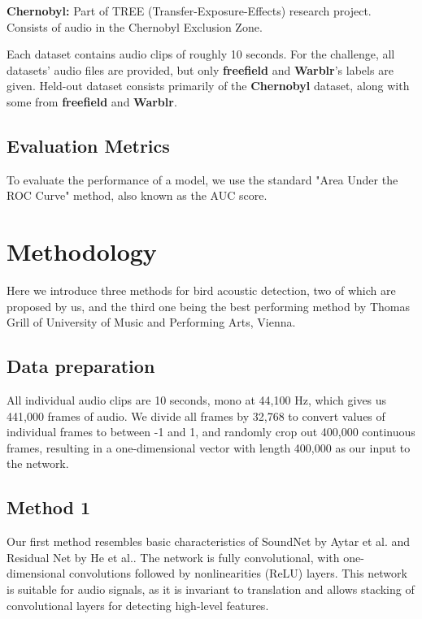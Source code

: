 \documentclass[10pt,twocolumn,letterpaper]{article}
\begin{document}
\textbf{Chernobyl:} Part of TREE (Transfer-Exposure-Effects) research
project. Consists of audio in the Chernobyl Exclusion Zone. 

Each dataset contains audio clips of roughly 10 seconds. For the challenge,
all datasets' audio files are provided, but only \textbf{freefield} and
\textbf{Warblr}'s labels are given. Held-out dataset consists primarily of
the \textbf{Chernobyl} dataset, along with some from \textbf{freefield} and
\textbf{Warblr}.

\subsection{Evaluation Metrics}

To evaluate the performance of a model, we use the standard "Area Under the
ROC Curve" method, also known as the AUC score.

\section{Methodology}

Here we introduce three methods for bird acoustic detection, two of which
are proposed by us, and the third one being the best performing method by
Thomas Grill of University of Music and Performing Arts, Vienna. 

\subsection{Data preparation}

All individual audio clips are 10 seconds, mono at 44,100 Hz, which gives us
441,000 frames of audio. We divide all frames by 32,768 to convert values of
individual frames to between -1 and 1, and randomly crop out 400,000
continuous frames, resulting in a one-dimensional vector with length 400,000
as our input to the network.

\subsection{Method 1}

Our first method resembles basic characteristics of SoundNet by Aytar et
al.\cite{soundnet} and Residual Net by He et al.\cite{residual_net}. The
network is fully convolutional, with one-dimensional convolutions followed
by nonlinearities (ReLU) layers.  This network is suitable for audio
signals, as it is invariant to translation and allows stacking of
convolutional layers for detecting high-level features.
\end{document}
